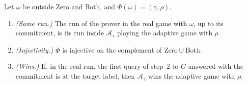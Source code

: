 \begin{lemma}
  \label{lem:co-ot-sim}
  \leanok
  Let $\omega$ be outside $\mathrm{Zero}$ and $\mathrm{Both}$, and $\Phi(\omega) = (\gamma, \rho)$.
  \begin{enumerate}
    \item \emph{(Same run.)} The run of the prover in the real game with $\omega$, up to its
    commitment, is its run inside $\mathcal{A}_\gamma$ playing the adaptive game with $\rho$.
    \item \emph{(Injectivity.)} $\Phi$ is injective on the complement of $\mathrm{Zero} \cup
    \mathrm{Both}$.
    \item \emph{(Wins.)} If, in the real run, the first query of step~2 to $G$ answered with the
    commitment is at the target label, then $\mathcal{A}_\gamma$ wins the adaptive game with $\rho$.
  \end{enumerate}
\end{lemma}

